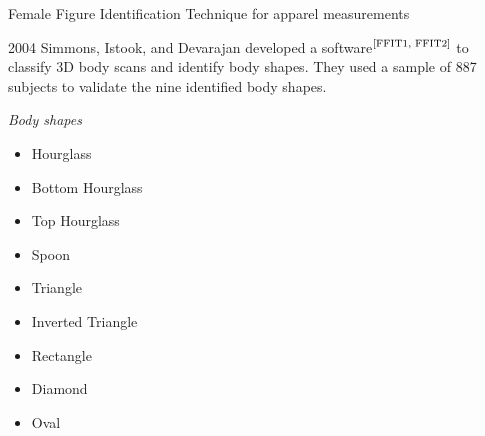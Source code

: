 \documentclass[10pt]{beamer}
\newcommand{\bib}[1]{$^\text{\cite{#1}}$}
\begin{document}
\begin{frame}{Female Figure Identification Technique for apparel measurements}
	\begin{block}{2004}
		Simmons, Istook, and Devarajan developed a software\bib{FFIT1, FFIT2} to classify 3D body scans and identify body shapes. They used a sample of 887 subjects to validate the nine identified body shapes.
	\end{block}
	\vspace{4mm}
	\begin{exampleblock}{\centering\itshape Body shapes}
		\begin{multicols}{3}
			\begin{itemize}
				\item Hourglass	\item Bottom Hourglass	\item Top Hourglass
				\item Spoon		\item Triangle			\item Inverted Triangle
				\item Rectangle	\item Diamond			\item Oval
			\end{itemize}
		\end{multicols}
	\end{exampleblock}
\end{frame}
\end{document}
